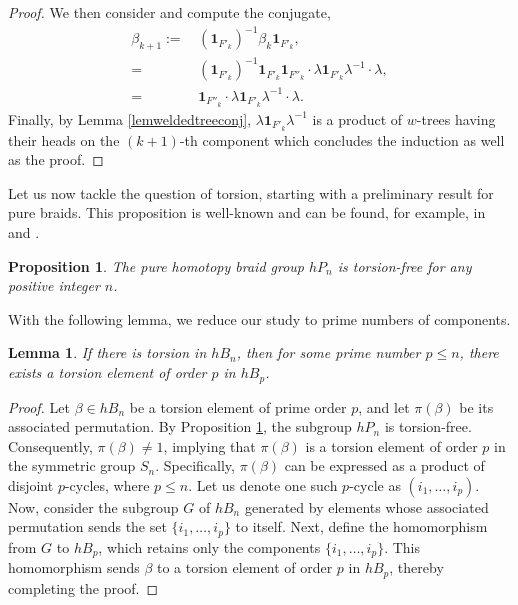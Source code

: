 \documentclass[11pt, a4paper, twoside,reqno]{amsart}
\theoremstyle{plain}
\newtheorem{lem}[thm]{Lemma}
\newtheorem{prop}[thm]{Proposition}
\theoremstyle{definition}
\theoremstyle{remark}
\begin{document}
\begin{proof}
We then consider and compute the conjugate,
\begin{align*}
    \beta_{k+1}:=&\,(\mathbf1_{F'_k})^{-1}\beta_k\mathbf1_{F'_k},\\
    =&\,(\mathbf1_{F'_k})^{-1}\mathbf1_{F'_k}\mathbf1_{F''_k}\cdot\lambda\mathbf1_{F'_k}\lambda^{-1}\cdot\lambda,\\
    =&\,\mathbf1_{F''_k}\cdot\lambda\mathbf1_{F'_k}\lambda^{-1}\cdot\lambda.
\end{align*}
Finally, by Lemma \ref{lemweldedtreeconj}, $\lambda\mathbf1_{F'_k}\lambda^{-1}$ is a product of $w$-trees having their heads on the $(k+1)$-th component which concludes the induction as well as the proof.
\end{proof}

Let us now tackle the question of torsion, starting with a preliminary result for pure braids. This proposition is well-known and can be found, for example, in \cite{HabeggerLinHomotopy} and \cite{HumphriesTorsion}.

\begin{prop}\label{prophPntorsionfree}
The pure homotopy braid group $hP_n$ is torsion-free for any positive integer $n$.
\end{prop}

With the following lemma, we reduce our study to prime numbers of components.

\begin{lem}\label{lemtorsionorder}
If there is torsion in $hB_n$, then for some prime number $p \leq n$, there exists a torsion element of order $p$ in $hB_p$. 
\end{lem}%
\begin{proof}
Let $\beta \in hB_n$ be a torsion element of prime order $p$, and let $\pi(\beta)$ be its associated permutation. By Proposition \ref{prophPntorsionfree}, the subgroup $hP_n$ is torsion-free. Consequently, $\pi(\beta) \neq 1$, implying that $\pi(\beta)$ is a torsion element of order $p$ in the symmetric group $S_n$. Specifically, $\pi(\beta)$ can be expressed as a product of disjoint $p$-cycles, where $p \leq n$. Let us denote one such $p$-cycle as $(i_1, \ldots, i_p)$. Now, consider the subgroup $G$ of $hB_n$ generated by elements whose associated permutation sends the set $\{i_1, \ldots, i_p\}$ to itself. Next, define the homomorphism from $G$ to $hB_p$, which retains only the components $\{i_1, \ldots, i_p\}$. This homomorphism sends $\beta$ to a torsion element of order $p$ in $hB_p$, thereby completing the proof.
\end{proof}
\end{document}
